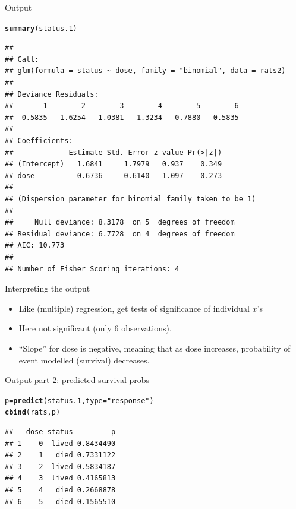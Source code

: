 \documentclass[unknownkeysallowed]{beamer}\usepackage[]{graphicx}\usepackage[]{color}
\makeatletter
\newcommand{\hlstr}[1]{\textcolor[rgb]{0.192,0.494,0.8}{#1}}%
\newcommand{\hlstd}[1]{\textcolor[rgb]{0.345,0.345,0.345}{#1}}%
\newcommand{\hlkwb}[1]{\textcolor[rgb]{0.69,0.353,0.396}{#1}}%
\newcommand{\hlkwc}[1]{\textcolor[rgb]{0.333,0.667,0.333}{#1}}%
\newcommand{\hlkwd}[1]{\textcolor[rgb]{0.737,0.353,0.396}{\textbf{#1}}}%
\newenvironment{kframe}{%
 \def\at@end@of@kframe{}%
 \ifinner\ifhmode%
  \def\at@end@of@kframe{\end{minipage}}%
  \begin{minipage}{\columnwidth}%
 \fi\fi%
 \def\FrameCommand##1{\hskip\@totalleftmargin \hskip-\fboxsep
 \colorbox{shadecolor}{##1}\hskip-\fboxsep
     \hskip-\linewidth \hskip-\@totalleftmargin \hskip\columnwidth}%
 \MakeFramed {\advance\hsize-\width
   \@totalleftmargin\z@ \linewidth\hsize
   \@setminipage}}%
 {\par\unskip\endMakeFramed%
 \at@end@of@kframe}
\newenvironment{knitrout}{}{} %
\makeatother
\begin{document}
\begin{frame}[fragile]{Output}

\begin{knitrout}\scriptsize
{}\color{fgcolor}\begin{kframe}
\begin{alltt}
\hlkwd{summary}\hlstd{(status.1)}
\end{alltt}
\begin{verbatim}
## 
## Call:
## glm(formula = status ~ dose, family = "binomial", data = rats2)
## 
## Deviance Residuals: 
##       1        2        3        4        5        6  
##  0.5835  -1.6254   1.0381   1.3234  -0.7880  -0.5835  
## 
## Coefficients:
##             Estimate Std. Error z value Pr(>|z|)
## (Intercept)   1.6841     1.7979   0.937    0.349
## dose         -0.6736     0.6140  -1.097    0.273
## 
## (Dispersion parameter for binomial family taken to be 1)
## 
##     Null deviance: 8.3178  on 5  degrees of freedom
## Residual deviance: 6.7728  on 4  degrees of freedom
## AIC: 10.773
## 
## Number of Fisher Scoring iterations: 4
\end{verbatim}
\end{kframe}
\end{knitrout}

\end{frame}


\begin{frame}{Interpreting the output}
  \begin{itemize}
  \item Like (multiple) regression, get
   tests of significance of individual $x$'s
  \item     Here not significant (only 6 observations).
  \item ``Slope'' for dose is negative, meaning that as dose increases, probability of event modelled (survival) decreases.

\end{itemize}

\end{frame}

\begin{frame}[fragile]{Output part 2: predicted survival probs}

  
 
\begin{knitrout}
\color{fgcolor}\begin{kframe}
\begin{alltt}
\hlstd{p}\hlkwb{=}\hlkwd{predict}\hlstd{(status.1,}\hlkwc{type}\hlstd{=}\hlstr{"response"}\hlstd{)}
\hlkwd{cbind}\hlstd{(rats,p)}
\end{alltt}
\begin{verbatim}
##   dose status         p
## 1    0  lived 0.8434490
## 2    1   died 0.7331122
## 3    2  lived 0.5834187
## 4    3  lived 0.4165813
## 5    4   died 0.2668878
## 6    5   died 0.1565510
\end{verbatim}
\end{kframe}
\end{knitrout}
  
\end{frame}
\end{document}
